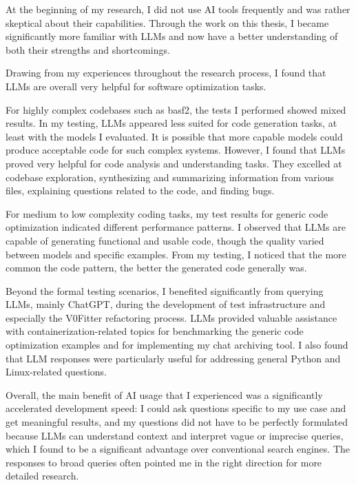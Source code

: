 At the beginning of my research, I did not use AI tools frequently and was rather skeptical about their capabilities.
Through the work on this thesis, I became significantly more familiar with LLMs and now have a better understanding of both their strengths and shortcomings.

Drawing from my experiences throughout the research process, I found that LLMs are overall very helpful for software optimization tasks.

\vspace{\baselineskip}
For highly complex codebases such as basf2, the tests I performed showed mixed results.
In my testing, LLMs appeared less suited for code generation tasks, at least with the models I evaluated.
It is possible that more capable models could produce acceptable code for such complex systems.
However, I found that LLMs proved very helpful for code analysis and understanding tasks.
They excelled at codebase exploration, synthesizing and summarizing information from various files, explaining questions related to the code, and finding bugs.

\vspace{\baselineskip}
For medium to low complexity coding tasks, my test results for generic code optimization indicated different performance patterns.
I observed that LLMs are capable of generating functional and usable code, though the quality varied between models and specific examples.
From my testing, I noticed that the more common the code pattern, the better the generated code generally was.

\vspace{\baselineskip}
Beyond the formal testing scenarios, I benefited significantly from querying LLMs, mainly ChatGPT, during the development of test infrastructure and especially the V0Fitter refactoring process.
LLMs provided valuable assistance with containerization-related topics for benchmarking the generic code optimization examples and for implementing my chat archiving tool.
I also found that LLM responses were particularly useful for addressing general Python and Linux-related questions.

\vspace{\baselineskip}
Overall, the main benefit of AI usage that I experienced was a significantly accelerated development speed:
I could ask questions specific to my use case and get meaningful results, and
my questions did not have to be perfectly formulated because LLMs can understand context and interpret vague or imprecise queries, which I found to be a significant advantage over conventional search engines.
The responses to broad queries often pointed me in the right direction for more detailed research.

